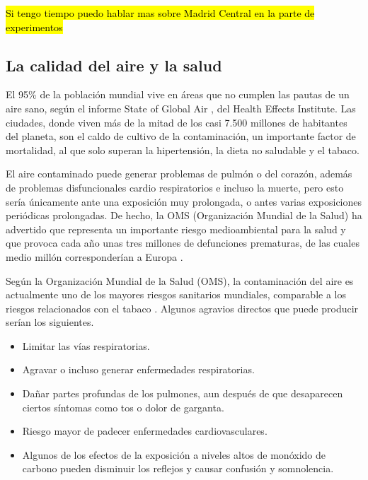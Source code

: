 
 \hl{Si tengo tiempo puedo hablar mas sobre Madrid Central en la parte de experimentos}

 \subsection{La calidad del aire y la salud}

El 95\% de la población mundial vive en áreas que no cumplen las pautas de un aire sano, según el informe State of Global Air \cite{state_global_air_2018}, del Health Effects Institute. Las ciudades, donde viven más de la mitad de los casi 7.500 millones de habitantes del planeta, son el caldo de cultivo de la contaminación, un importante factor de mortalidad, al que solo superan la hipertensión, la dieta no saludable y el tabaco.

El aire contaminado puede generar problemas de pulmón o del corazón, además de problemas disfuncionales cardio respiratorios e incluso la muerte, pero esto sería únicamente ante una exposición muy prolongada, o antes varias exposiciones periódicas prolongadas. De hecho, la OMS (Organización Mundial de la Salud) ha advertido que representa un importante riesgo medioambiental para la salud y que provoca cada año unas tres millones de defunciones prematuras, de las cuales medio millón corresponderían a Europa \cite{2018_oms_calidad}.

Según la Organización Mundial de la Salud (OMS), la contaminación del aire es actualmente uno de los mayores riesgos sanitarios mundiales, comparable a los riesgos relacionados con el tabaco  \cite{2018_oms_calidad}. Algunos agravios directos que puede producir serían los siguientes.

\begin{itemize}
\item Limitar las vías respiratorias.

\item Agravar o incluso generar enfermedades respiratorias.

\item Dañar partes profundas de los pulmones, aun después de que desaparecen ciertos síntomas como tos o dolor de garganta.

\item Riesgo mayor de padecer enfermedades cardiovasculares.

\item Algunos de los efectos de la exposición a niveles altos de monóxido de carbono pueden disminuir los reflejos y causar confusión y somnolencia.	
	
\end{itemize}



